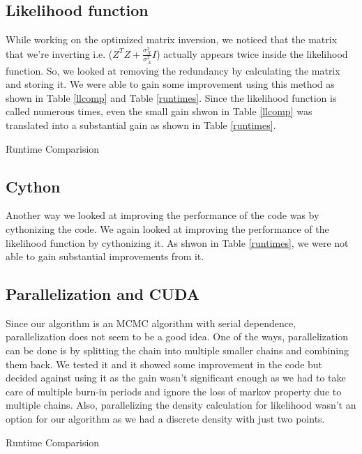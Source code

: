 \documentclass{article}
\begin{document}
\subsection{Likelihood function}
While working on the optimized matrix inversion, we noticed that the matrix that we're inverting i.e. ($Z^TZ+\frac{\sigma_X^2}{\sigma_A^2}I$) actually appears twice inside the likelihood function. So, we looked at removing the redundancy by calculating the matrix and storing it. We were able to gain some improvement using this method as shown in Table \ref{llcomp} and Table \ref{runtimes}. Since the likelihood function is called numerous times, even the small gain shwon in Table \ref{llcomp} was translated into a substantial gain as shown in Table \ref{runtimes}.\\


\begin{table}[ht]
\centering
\caption{Runtime Comparision \label{llcomp}}


\end{table}

\subsection{Cython}
Another way we looked at improving the performance of the code was by cythonizing the code. We again looked at improving the performance of the likelihood function by cythonizing it. As shwon in Table \ref{runtimes}, we were not able to gain substantial improvements from it.\\


\subsection{Parallelization and CUDA}
Since our algorithm is an MCMC algorithm with serial dependence, parallelization does not seem to be a good idea. One of the ways, parallelization can be done is by splitting the chain into multiple smaller chains and combining them back. We tested it and it showed some improvement in the code but decided against using it as the gain wasn't significant enough as we had to take care of multiple burn-in periods and ignore the loss of markov property due to multiple chains. Also, parallelizing the density calculation for likelihood wasn't an option for our algorithm as we had a discrete density with just two points.


\begin{table}[ht]
\centering
\caption{Runtime Comparision \label{runtimes}}

\end{table}
\end{document}
